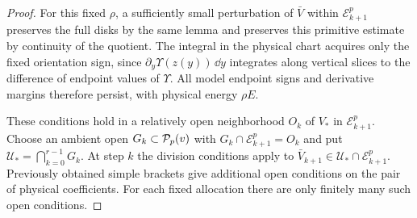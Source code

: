\begin{proof}
For this fixed $\rho$, a sufficiently small perturbation of $\bar V$ within $\mathcal E_{k+1}^p$ preserves the full disks by the same lemma and preserves this primitive estimate by continuity of the quotient. The integral in the physical chart acquires only the fixed orientation sign, since $\partial_y\Upsilon(z(y))\,\dd y$ integrates along vertical slices to the difference of endpoint values of $\Upsilon$. All model endpoint signs and derivative margins therefore persist, with physical energy $\rho E$.

These conditions hold in a relatively open neighborhood $O_k$ of $V_*$ in $\mathcal E_{k+1}^p$. Choose an ambient open $G_k\subset\mathcal{P}_p(v)$ with $G_k\cap\mathcal E_{k+1}^p=O_k$ and put $\mathcal U_*=\bigcap_{k=0}^{r-1}G_k$. At step $k$ the division conditions apply to $\bar V_{k+1}\in\mathcal U_*\cap\mathcal E_{k+1}^p$. Previously obtained simple brackets give additional open conditions on the pair of physical coefficients. For each fixed allocation there are only finitely many such open conditions.


\end{proof}
